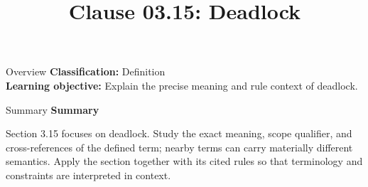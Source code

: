\documentclass[10pt,letterpaper]{article}
\title{Clause 03.15: Deadlock}
\author{}
\date{}
\begin{document}
\maketitle
\begin{CornellOverviewBox}{Overview}
\textbf{Classification:} Definition\\[2pt]
\textbf{Learning objective:} Explain the precise meaning and rule context of deadlock.
\end{CornellOverviewBox}\begin{CornellSummaryBox}{Summary}
{\sffamily\bfseries\color{Accent} Summary}\par\vspace{3pt}Section 3.15 focuses on deadlock. Study the exact meaning, scope qualifier, and cross-references of the defined term; nearby terms can carry materially different semantics. Apply the section together with its cited rules so that terminology and constraints are interpreted in context.
\end{CornellSummaryBox}
\end{document}

